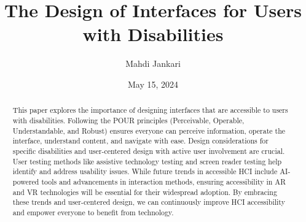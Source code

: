 \documentclass[a4paper, 12pt]{article}
\title{The Design of Interfaces for Users with Disabilities}
\author{Mahdi Jankari}
\date{May 15, 2024}
\begin{document}
\maketitle

\begin{abstract}
This paper explores the importance of designing interfaces that are accessible
to users with disabilities. Following the POUR principles (Perceivable,
Operable, Understandable, and Robust) ensures everyone can perceive information,
operate the interface, understand content, and navigate with ease. Design
considerations for specific disabilities and user-centered design with active
user involvement are crucial. User testing methods like assistive technology
testing and screen reader testing help identify and address usability issues.
While future trends in accessible HCI include AI-powered tools and advancements
in interaction methods, ensuring accessibility in AR and VR technologies will be
essential for their widespread adoption. By embracing these trends and
user-centered design, we can continuously improve HCI accessibility and empower
everyone to benefit from technology.
\end{abstract}









\nocite{*}
\printbibliography
\end{document}
